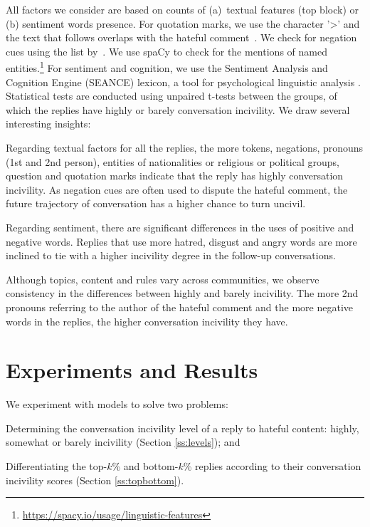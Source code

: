 \documentclass[11pt]{article}
\begin{document}
	All factors we consider are based on counts of
	(a)~textual features (top block)
	or
	(b) sentiment words presence.
	For quotation marks, we use the character  '>' and the text that follows overlaps with the hateful comment~\cite{chakrabarty-etal-2019-ampersand,jo-etal-2020-detecting}.
	We check for negation cues using the list by~\citet{fancellu-etal-2016-neural}. 
	We use spaCy to check for the mentions of named entities.\footnote{\url{https://spacy.io/usage/linguistic-features}}
	For sentiment and cognition, we use the Sentiment Analysis and Cognition Engine (SEANCE) lexicon,
	a tool for psychological linguistic analysis \cite{crossley2017sentiment}. 
	Statistical tests are conducted using unpaired t-tests between the groups, of which the replies have highly or barely conversation incivility.
	We draw several interesting insights:
	\begin{compactitem}
		\item Regarding textual factors for all the replies, the more tokens, negations, pronouns (1st and 2nd person), entities of nationalities or religious or political groups, question and quotation marks indicate that the reply has highly conversation incivility.
		As negation cues are often used to dispute the hateful comment, the future trajectory of conversation has a higher chance to turn uncivil.
		\item Regarding sentiment, there are significant differences in the uses of positive and negative words. Replies that use more hatred, disgust and angry words are more inclined to tie with a higher incivility degree in the follow-up conversations.
		\item Although topics, content and rules vary across communities, we observe consistency in the differences between highly and barely incivility. The more 2nd pronouns referring to the author of the hateful comment and the more negative words in the replies, the higher conversation incivility they have.
	\end{compactitem}
	
	
	
	\section{Experiments and Results} 
	\label{s:experiments}
	
	We experiment with models to solve two problems:
	\begin{compactitem}
		\item Determining the conversation incivility level of a reply to hateful content: highly, somewhat or barely incivility (Section \ref{ss:levels}); and
		\item Differentiating the top-$k$\% and bottom-$k$\% replies according to their conversation incivility scores (Section \ref{ss:topbottom}).
	\end{compactitem}
	
\end{document}
